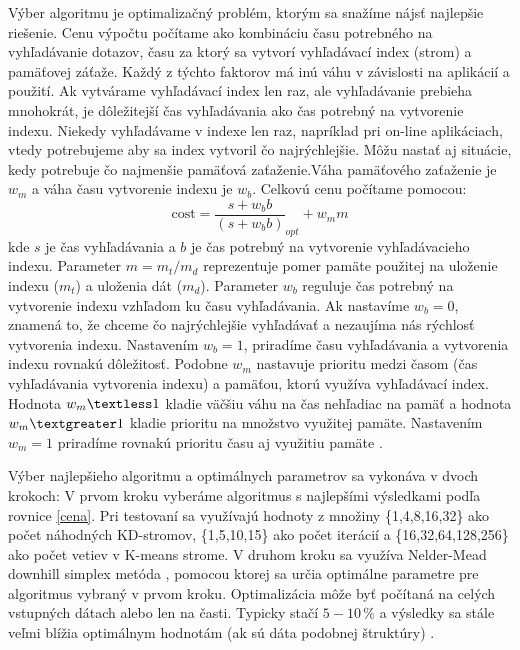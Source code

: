 \documentclass[12pt,a4paper,oneside]{fithesis2}
\begin{document}
	Výber algoritmu je optimalizačný problém, ktorým sa snažíme nájsť najlepšie riešenie. Cenu výpočtu počítame ako kombináciu času potrebného na vyhľadávanie dotazov, času za ktorý sa vytvorí vyhľadávací index (strom) a pamäťovej záťaže. Každý z týchto faktorov má inú váhu v závislosti na aplikácií a použití. Ak vytvárame vyhľadávací index len raz, ale vyhľadávanie prebieha mnohokrát, je dôležitejší čas vyhľadávania ako čas potrebný na vytvorenie indexu. Niekedy vyhľadávame v indexe len raz, napríklad pri on-line aplikáciach, vtedy potrebujeme aby sa index vytvoril čo najrýchlejšie. Môžu nastať aj situácie, kedy potrebuje čo najmenšie pamäťová zaťaženie.Váha pamäťového zaťaženie je $w_m$ a váha času vytvorenie indexu je $w_b$. Celkovú cenu počítame pomocou:
	\begin{equation}
	\mathrm{cost} = \dfrac{s + w_bb}{(s + w_bb)}_{opt} + w_mm
	\label{cena}
	\end{equation}
kde $s$ je čas vyhľadávania a $b$ je čas potrebný na vytvorenie vyhľadávacieho indexu. Parameter $m = m_t/m_d$ reprezentuje pomer pamäte použitej na uloženie indexu ($m_t$) a uloženia dát ($m_d$). Parameter $w_b$ reguluje čas potrebný na vytvorenie indexu vzhľadom ku času vyhľadávania. Ak nastavíme $w_b = 0$, znamená to, že chceme čo najrýchlejšie vyhľadávať a nezaujíma nás rýchlosť vytvorenia indexu. Nastavením $w_b = 1$, priradíme času vyhľadávania a vytvorenia indexu rovnakú dôležitosť. Podobne $w_m$ nastavuje prioritu medzi časom (čas vyhľadávania vytvorenia indexu) a pamäťou, ktorú využíva vyhľadávací index. Hodnota $w_m \textless 1$ kladie väčšiu váhu na čas nehľadiac na pamäť a hodnota $w_m \textgreater 1$  kladie prioritu na množstvo využitej pamäte. Nastavením $w_m = 1$ priradíme rovnakú prioritu času aj využitiu pamäte \cite{muja_flann_2009}. 

Výber najlepšieho algoritmu a optimálnych parametrov sa vykonáva v dvoch krokoch: V prvom kroku vyberáme algoritmus s najlepšími výsledkami podľa rovnice \ref{cena}. Pri testovaní sa využívajú hodnoty z množiny \{1,4,8,16,32\} ako počet náhodných KD-stromov, \{1,5,10,15\} ako počet iterácií a \{16,32,64,128,256\} ako počet vetiev v K-means strome. V druhom kroku sa využíva Nelder-Mead downhill simplex metóda \cite{NelderMead65}, pomocou ktorej sa určia optimálne parametre pre algoritmus vybraný v prvom kroku. Optimalizácia môže byť počítaná na celých vstupných dátach alebo len na časti. Typicky stačí $5-10\,\%$ a výsledky sa stále veľmi blížia optimálnym hodnotám (ak sú dáta podobnej štruktúry) \cite{muja_flann_2009}.
\end{document}

